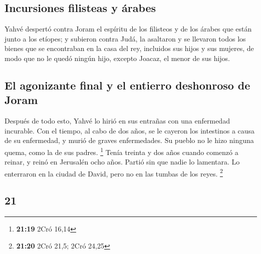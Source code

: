 \begin{paracol}{2}
\hypertarget{incursiones-filisteas-y-uxe1rabes}{%
\subsection{Incursiones filisteas y
árabes}\label{incursiones-filisteas-y-uxe1rabes}}

 Yahvé despertó contra Joram el espíritu de los filisteos
y de los árabes que están junto a los etíopes;  y
subieron contra Judá, la asaltaron y se llevaron todos los bienes que se
encontraban en la casa del rey, incluidos sus hijos y sus mujeres, de
modo que no le quedó ningún hijo, excepto Joacaz, el menor de sus hijos.

\hypertarget{el-agonizante-final-y-el-entierro-deshonroso-de-joram}{%
\subsection{El agonizante final y el entierro deshonroso de
Joram}\label{el-agonizante-final-y-el-entierro-deshonroso-de-joram}}

 Después de todo esto, Yahvé lo hirió en sus entrañas con
una enfermedad incurable.  Con el tiempo, al cabo de dos
años, se le cayeron los intestinos a causa de su enfermedad, y murió de
graves enfermedades. Su pueblo no le hizo ninguna quema, como la de sus
padres. \footnote{\textbf{21:19} 2Cró 16,14}  Tenía
treinta y dos años cuando comenzó a reinar, y reinó en Jerusalén ocho
años. Partió sin que nadie lo lamentara. Lo enterraron en la ciudad de
David, pero no en las tumbas de los reyes. \footnote{\textbf{21:20} 2Cró
  21,5; 2Cró 24,25}

\switchcolumn
\begin{otherlanguage}{english}

\hypertarget{section-41}{%
\section{21}\label{section-41}}


\end{otherlanguage}
\end{paracol}
